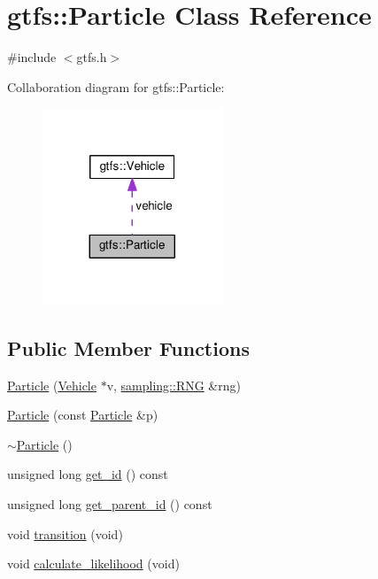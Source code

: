 \hypertarget{classgtfs_1_1Particle}{}\section{gtfs\+:\+:Particle Class Reference}
\label{classgtfs_1_1Particle}


{\ttfamily \#include $<$gtfs.\+h$>$}



Collaboration diagram for gtfs\+:\+:Particle\+:
\nopagebreak
\begin{figure}[H]
\begin{center}
\leavevmode
\includegraphics[width=152pt]{classgtfs_1_1Particle__coll__graph}
\end{center}
\end{figure}
\subsection*{Public Member Functions}
\begin{DoxyCompactItemize}
\item 
\hyperlink{classgtfs_1_1Particle_ae59d459c6ff20eb081a933b304289794}{Particle} (\hyperlink{classgtfs_1_1Vehicle}{Vehicle} $\ast$v, \hyperlink{classsampling_1_1RNG}{sampling\+::\+R\+NG} \&rng)
\item 
\hyperlink{classgtfs_1_1Particle_ac386e64b43b1e317063f9a6666d604ce}{Particle} (const \hyperlink{classgtfs_1_1Particle}{Particle} \&p)
\item 
\hyperlink{classgtfs_1_1Particle_a3accf3496ad8460b4ad8b3f6da2de411}{$\sim$\+Particle} ()
\item 
unsigned long \hyperlink{classgtfs_1_1Particle_a3131eb93ac902a4cccf42061e1a7296b}{get\+\_\+id} () const
\item 
unsigned long \hyperlink{classgtfs_1_1Particle_a9372dbbfe702b9931b9eb1ee217afcba}{get\+\_\+parent\+\_\+id} () const
\item 
void \hyperlink{classgtfs_1_1Particle_a768469c09fdebd8e190c91a653b25b76}{transition} (void)
\item 
void \hyperlink{classgtfs_1_1Particle_a88627efbe0eb2e289315ae82627d3a39}{calculate\+\_\+likelihood} (void)
\end{DoxyCompactItemize}
